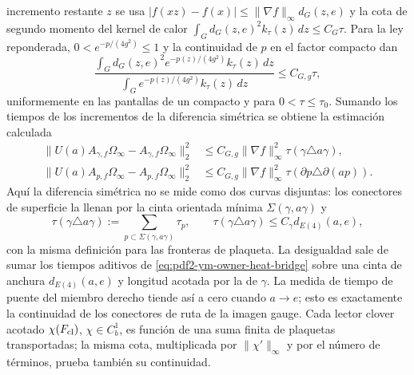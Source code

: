 incremento restante $z$ se usa
$|f(xz)-f(x)|\le\|\nabla f\|_\infty d_G(z,e)$ y la cota de segundo momento del
kernel de calor
\(
 \int_Gd_G(z,e)^2k_\tau(z)\,dz\le C_G\tau
\).
Para la ley reponderada, $0<e^{-p/(4g^2)}\le1$ y la continuidad de $p$ en el
factor compacto dan
\begin{equation}\label{eq:pdf2-ym-owner-gibbs-heat-moment}
 \frac{\int_Gd_G(z,e)^2e^{-p(z)/(4g^2)}k_\tau(z)\,dz}
      {\int_Ge^{-p(z)/(4g^2)}k_\tau(z)\,dz}
 \le C_{G,g}\tau,
\end{equation}
uniformemente en las pantallas de un compacto y para $0<\tau\le\tau_0$.
Sumando los tiempos de los incrementos de la diferencia simétrica se obtiene la
estimación calculada
\begin{equation}\label{eq:pdf2-ym-owner-holonomy-e4-estimate}
 \begin{aligned}
 \|U(a)A_{\gamma,f}\Omega_\infty-A_{\gamma,f}\Omega_\infty\|_2^2
 &\le C_{G,g}\|\nabla f\|_\infty^2
     \tau(\gamma\triangle a\gamma),\\
 \|U(a)A_{p,f}\Omega_\infty-A_{p,f}\Omega_\infty\|_2^2
 &\le C_{G,g}\|\nabla f\|_\infty^2
     \tau(\partial p\triangle\partial(ap)).
 \end{aligned}
\end{equation}
Aquí la diferencia simétrica no se mide como dos curvas disjuntas: los conectores
de superficie la llenan por la cinta orientada mínima
$\Sigma(\gamma,a\gamma)$ y
\begin{equation}\label{eq:pdf2-ym-owner-bridge-time-ribbon}
 \tau(\gamma\triangle a\gamma)
 :=\sum_{p\subset\Sigma(\gamma,a\gamma)}\tau_p,
 \qquad
 \tau(\gamma\triangle a\gamma)
 \le C_\gamma d_{E(4)}(a,e),
\end{equation}
con la misma definición para las fronteras de plaqueta. La desigualdad sale de
sumar los tiempos aditivos de \eqref{eq:pdf2-ym-owner-heat-bridge} sobre una cinta
de anchura $d_{E(4)}(a,e)$ y longitud acotada por la de $\gamma$.
La medida de tiempo de puente del miembro derecho tiende así a cero cuando $a\to e$;
esto es exactamente la continuidad de los conectores de ruta de la imagen gauge.
Cada lector clover acotado $\chi(F_{\rm cl})$, $\chi\in C_b^1$, es función de una
suma finita de plaquetas transportadas; la misma cota, multiplicada por
$\|\chi'\|_\infty$ y por el número de términos, prueba también su continuidad.

